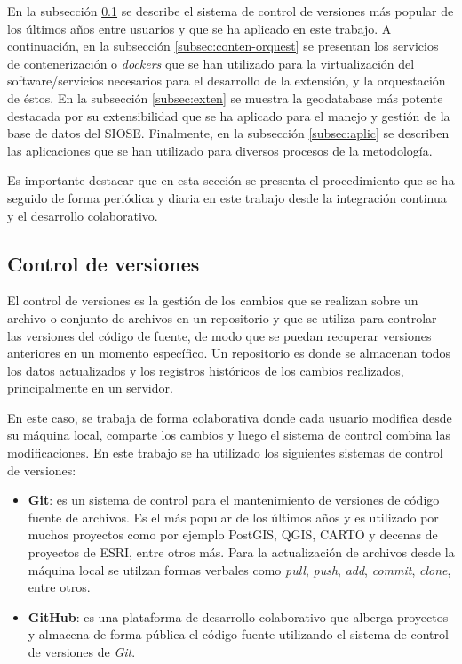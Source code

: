En la subsección \ref{subsec:control} se describe el sistema de control de versiones más popular de los últimos años entre usuarios y que se ha aplicado en este trabajo. A continuación, en la subsección \ref{subsec:conten-orquest} se presentan los servicios de contenerización o \textit{dockers} que se han utilizado para la virtualización del software/servicios necesarios para el desarrollo de la extensión, y la orquestación de éstos. En la subsección \ref{subsec:exten} se muestra la geodatabase más potente destacada por su extensibilidad que se ha aplicado para el manejo y gestión de la base de datos del SIOSE. Finalmente, en la subsección \ref{subsec:aplic} se describen las aplicaciones que se han utilizado para diversos procesos de la metodología.

Es importante destacar que en esta sección se presenta el procedimiento que se ha seguido de forma periódica y diaria en este trabajo desde la integración continua y el desarrollo colaborativo.


\subsection{Control de versiones}\label{subsec:control}

El control de versiones es la gestión de los cambios que se realizan sobre un archivo o conjunto de archivos en un repositorio y que se utiliza para controlar las versiones del código de fuente, de modo que se puedan recuperar versiones anteriores en un momento específico. Un repositorio es donde se almacenan todos los datos actualizados y los registros históricos de los cambios realizados, principalmente en un servidor. 

En este caso, se trabaja de forma colaborativa donde cada usuario modifica desde su máquina local, comparte los cambios y luego el sistema de control combina las modificaciones. En este trabajo se ha utilizado los siguientes sistemas de control de versiones:

\begin{itemize}
\item\textbf{Git}: es un sistema de control para el mantenimiento de versiones de código fuente de archivos. Es el más popular de los últimos años y es utilizado por muchos proyectos como por ejemplo PostGIS, QGIS, CARTO y decenas de proyectos de ESRI, entre otros más. Para la actualización de archivos desde la máquina local se utilzan formas verbales como \textit{pull}, \textit{push}, \textit{add}, \textit{commit}, \textit{clone}, entre otros.
\item\textbf{GitHub}: es una plataforma de desarrollo colaborativo que alberga proyectos y almacena de forma pública el código fuente utilizando el sistema de control de versiones de \textit{Git}.
\end{itemize}

